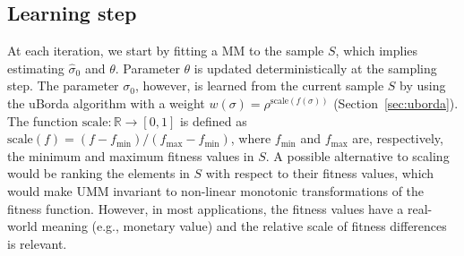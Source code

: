 \documentclass[sigconf,dvipsnames]{acmart}
\begin{document}




\newcommand{\Edist}{\ensuremath{\mathbb{E}[D]}}


\subsection{Learning step}
%
At each iteration, we start by fitting a MM to the sample $S$, which implies
estimating $\hat\sigma_0$ and $\theta$. Parameter $\theta$ is updated
deterministically at the sampling step.  The parameter $\sigma_0$, however, is
learned from the current sample $S$ by using the uBorda algorithm with a weight
$w(\sigma)=\rho^{\text{scale}(f(\sigma))}$ (Section~\ref{sec:uborda}). The function $\text{scale}\colon \mathbb{R} \to [0,1]$ is defined as $\text{scale}(f) = (f - f_\text{min})/(f_\text{max} - f_\text{min})$, where $f_\text{min}$ and $f_\text{max}$ are, respectively, the minimum and maximum fitness values in $S$. A possible alternative to scaling would be ranking the elements in $S$ with respect to their fitness values, which would make UMM invariant to non-linear monotonic transformations of the fitness function. However, in most applications, the fitness values have a real-world meaning (e.g., monetary value) and the relative scale of fitness differences is relevant.
\end{document}
